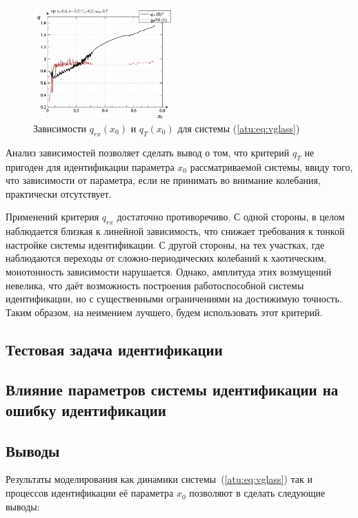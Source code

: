\begin{figure}[ht!]
\begin{center}
  \includegraphics[width=0.49\textwidth]{p/cha/vg/vg_q1-p_q.png}
\end{center}
  \caption{Зависимости $q_{rx}(x_0)$ и $q_T(x_0)$ для системы (\ref{atu:eq:vglass})}
\label{atu:f:vglass_q}
\end{figure}

Анализ зависимостей позволяет сделать вывод о том, что критерий $q_T$
не пригоден для идентификации параметра $x_0$
рассматриваемой системы, ввиду того,
что зависимости от параметра, если не принимать во внимание колебания,
практически отсутствует.

Применений критерия $q_{rx}$ достаточно противоречиво.
С одной стороны, в целом наблюдается близкая к линейной зависимость,
что снижает требования к тонкой настройке системы идентификации.
С другой стороны, на тех участках,
где наблюдаются переходы от сложно-периодических колебаний
к хаотическим, монотонность зависимости нарушается.
Однако, амплитуда этих возмущений невелика,
что даёт возможность построения работоспособной системы идентификации,
но с существенными ограничениями на достижимую точность.
Таким образом, на неимением лучшего, будем использовать этот критерий.




\subsection{Тестовая задача идентификации}  %


\subsection{Влияние параметров системы идентификации на ошибку идентификации}  %



\subsection{Выводы}  %

Результаты моделирования
как динамики системы~(\ref{atu:eq:vglass})
так и процессов идентификации её параметра $x_0$
позволяют в сделать следующие выводы:



